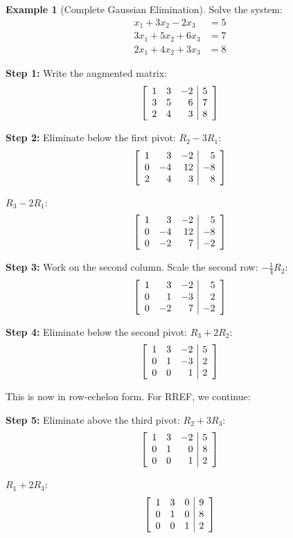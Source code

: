 \documentclass[12pt]{article}
\numberwithin{equation}{section}
\newenvironment{amatrix}[1]{%
  \left[\begin{array}{#1}}
  {\end{array}\right]}
\theoremstyle{plain}
\theoremstyle{definition}
\newtheorem{example}[theorem]{Example}
\theoremstyle{remark}
\begin{document}
\begin{example}[Complete Gaussian Elimination]
Solve the system:
\begin{align}
x_1 + 3x_2 - 2x_3 &= 5\\
3x_1 + 5x_2 + 6x_3 &= 7\\
2x_1 + 4x_2 + 3x_3 &= 8
\end{align}

\textbf{Step 1:} Write the augmented matrix:
$$\begin{amatrix}{rrr|r}
1 & 3 & -2 & 5\\
3 & 5 & 6 & 7\\
2 & 4 & 3 & 8
\end{amatrix}$$

\textbf{Step 2:} Eliminate below the first pivot:
$R_2 - 3R_1$: 
$$\begin{amatrix}{rrr|r}
1 & 3 & -2 & 5\\
0 & -4 & 12 & -8\\
2 & 4 & 3 & 8
\end{amatrix}$$

$R_3 - 2R_1$:
$$\begin{amatrix}{rrr|r}
1 & 3 & -2 & 5\\
0 & -4 & 12 & -8\\
0 & -2 & 7 & -2
\end{amatrix}$$

\textbf{Step 3:} Work on the second column. Scale the second row:
$-\frac{1}{4}R_2$:
$$\begin{amatrix}{rrr|r}
1 & 3 & -2 & 5\\
0 & 1 & -3 & 2\\
0 & -2 & 7 & -2
\end{amatrix}$$

\textbf{Step 4:} Eliminate below the second pivot:
$R_3 + 2R_2$:
$$\begin{amatrix}{rrr|r}
1 & 3 & -2 & 5\\
0 & 1 & -3 & 2\\
0 & 0 & 1 & 2
\end{amatrix}$$

This is now in row-echelon form. For RREF, we continue:

\textbf{Step 5:} Eliminate above the third pivot:
$R_2 + 3R_3$:
$$\begin{amatrix}{rrr|r}
1 & 3 & -2 & 5\\
0 & 1 & 0 & 8\\
0 & 0 & 1 & 2
\end{amatrix}$$

$R_1 + 2R_3$:
$$\begin{amatrix}{rrr|r}
1 & 3 & 0 & 9\\
0 & 1 & 0 & 8\\
0 & 0 & 1 & 2
\end{amatrix}$$


\end{example}
\end{document}
